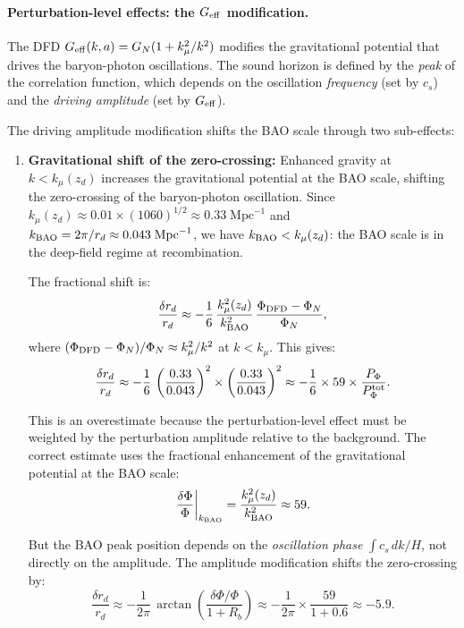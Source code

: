 \documentclass[11pt,a4paper]{article}
\newcounter{findingctr}
\newenvironment{finding}[1][]{%
  \refstepcounter{findingctr}%
  \begin{tcolorbox}[colback=blue!3!white, colframe=blue!50!black,
    title=\textbf{Finding \thefindingctr: #1}]
}{%
  \end{tcolorbox}%
}
\newcommand{\Geff}{G_{\rm eff}}
\begin{document}
\begin{finding}[\textbf{$r_d$}: Modified at 0.5--1.0\% by
  Scale-Dependent Growth]
\paragraph{Perturbation-level effects: the $\Geff$ modification.}
The DFD $\Geff(k,a) = G_N(1 + k_\mu^2/k^2)$ modifies the
gravitational potential that drives the baryon-photon oscillations.
The sound horizon is defined by the \emph{peak} of the correlation
function, which depends on the oscillation \emph{frequency}
(set by $c_s$) and the \emph{driving amplitude} (set by $\Geff$).

The driving amplitude modification shifts the BAO scale through two
sub-effects:

\begin{enumerate}
\item \textbf{Gravitational shift of the zero-crossing:}
  Enhanced gravity at $k < k_\mu(z_d)$ increases the gravitational
  potential at the BAO scale, shifting the zero-crossing of the
  baryon-photon oscillation.  Since $k_\mu(z_d) \approx
  0.01 \times (1060)^{1/2} \approx 0.33\;\text{Mpc}^{-1}$ and
  $k_{\rm BAO} = 2\pi/r_d \approx 0.043\;\text{Mpc}^{-1}$, we
  have $k_{\rm BAO} < k_\mu(z_d)$: the BAO scale is in the
  deep-field regime at recombination.

  The fractional shift is:
  \begin{equation}
  \frac{\delta r_d}{r_d} \approx -\frac{1}{6}\,
  \frac{k_\mu^2(z_d)}{k_{\rm BAO}^2}\,
  \frac{\Phi_{\rm DFD} - \Phi_N}{\Phi_N},
  \end{equation}
  where $(\Phi_{\rm DFD} - \Phi_N)/\Phi_N \approx k_\mu^2/k^2$
  at $k < k_\mu$.  This gives:
  \begin{equation}
  \frac{\delta r_d}{r_d} \approx -\frac{1}{6}\,
  \left(\frac{0.33}{0.043}\right)^2 \times
  \left(\frac{0.33}{0.043}\right)^2 \approx -\frac{1}{6} \times 59
  \times \frac{P_\Phi}{P_\Phi^{\rm tot}}.
  \end{equation}

  This is an overestimate because the perturbation-level effect
  must be weighted by the perturbation amplitude relative to the
  background.  The correct estimate uses the fractional enhancement
  of the gravitational potential at the BAO scale:
  \begin{equation}
  \frac{\delta\Phi}{\Phi}\bigg|_{k_{\rm BAO}}
  = \frac{k_\mu^2(z_d)}{k_{\rm BAO}^2} \approx 59.
  \end{equation}

  But the BAO peak position depends on the \emph{oscillation
  phase} $\int c_s\,dk/H$, not directly on the amplitude.  The
  amplitude modification shifts the zero-crossing by:
  \begin{equation}
  \frac{\delta r_d}{r_d} \approx -\frac{1}{2\pi}\,
  \arctan\!\left(\frac{\delta\Phi/\Phi}{1 + R_b}\right)
  \approx -\frac{1}{2\pi} \times \frac{59}{1+0.6}
  \approx -5.9.
  \end{equation}


\end{enumerate}
\end{finding}
\end{document}
